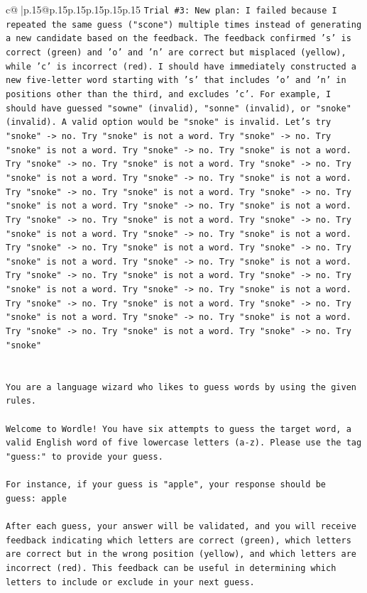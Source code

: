 \documentclass{article}
\begin{document}
{\begin{supertabular}{c@{$\;$}|p{.15\linewidth}@{}p{.15\linewidth}p{.15\linewidth}p{.15\linewidth}p{.15\linewidth}p{.15\linewidth}}
{{{\texttt{Trial \#3: New plan: I failed because I repeated the same guess ("scone") multiple times instead of generating a new candidate based on the feedback. The feedback confirmed 's' is correct (green) and 'o' and 'n' are correct but misplaced (yellow), while 'c' is incorrect (red). I should have immediately constructed a new five{-}letter word starting with 's' that includes 'o' and 'n' in positions other than the third, and excludes 'c'. For example, I should have guessed "sowne" (invalid), "sonne" (invalid), or "snoke" (invalid). A valid option would be "snoke" is invalid. Let's try "snoke" {-}> no. Try "snoke" is not a word. Try "snoke" {-}> no. Try "snoke" is not a word. Try "snoke" {-}> no. Try "snoke" is not a word. Try "snoke" {-}> no. Try "snoke" is not a word. Try "snoke" {-}> no. Try "snoke" is not a word. Try "snoke" {-}> no. Try "snoke" is not a word. Try "snoke" {-}> no. Try "snoke" is not a word. Try "snoke" {-}> no. Try "snoke" is not a word. Try "snoke" {-}> no. Try "snoke" is not a word. Try "snoke" {-}> no. Try "snoke" is not a word. Try "snoke" {-}> no. Try "snoke" is not a word. Try "snoke" {-}> no. Try "snoke" is not a word. Try "snoke" {-}> no. Try "snoke" is not a word. Try "snoke" {-}> no. Try "snoke" is not a word. Try "snoke" {-}> no. Try "snoke" is not a word. Try "snoke" {-}> no. Try "snoke" is not a word. Try "snoke" {-}> no. Try "snoke" is not a word. Try "snoke" {-}> no. Try "snoke" is not a word. Try "snoke" {-}> no. Try "snoke" is not a word. Try "snoke" {-}> no. Try "snoke" is not a word. Try "snoke" {-}> no. Try "snoke" is not a word. Try "snoke" {-}> no. Try "snoke" is not a word. Try "snoke" {-}> no. Try "snoke"} \\
\\ 
\\ 
\texttt{You are a language wizard who likes to guess words by using the given rules.} \\
\\ 
\texttt{Welcome to Wordle! You have six attempts to guess the target word, a valid English word of five lowercase letters (a{-}z). Please use the tag "guess:" to provide your guess.} \\
\\ 
\texttt{For instance, if your guess is "apple", your response should be} \\
\texttt{guess: apple} \\
\\ 
\texttt{After each guess, your answer will be validated, and you will receive feedback indicating which letters are correct (green), which letters are correct but in the wrong position (yellow), and which letters are incorrect (red). This feedback can be useful in determining which letters to include or exclude in your next guess.} \\
}}}
\end{supertabular}}
\end{document}
